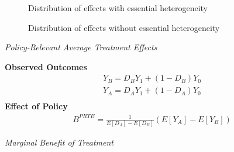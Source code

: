 \begin{frame}
	\begin{figure}\caption{Distribution of effects with essential heterogeneity}
	\end{figure}
\end{frame}
\begin{frame}
	\begin{figure}\caption{Distribution of effects without essential heterogeneity}
	\end{figure}
\end{frame}
\begin{frame}\begin{center}
		\LARGE\textit{Policy-Relevant Average Treatment Effects}
\end{center}\end{frame}
\begin{frame}
	\textbf{Observed Outcomes}
	\begin{align*}
		Y_B = D_B Y_1 + (1 - D_B) Y_0 \\
		Y_A = D_A Y_1 + (1 - D_A) Y_0 \\
	\end{align*}
	\textbf{Effect of Policy}
	\begin{align*}
		B^{PRTE} = \frac{1}{E[D_A] - E[D_B]} (E[Y_A] - E[Y_B])
	\end{align*}
\end{frame}
\begin{frame}\begin{center}
		\LARGE\textit{Marginal Benefit of Treatment}
\end{center}\end{frame}
